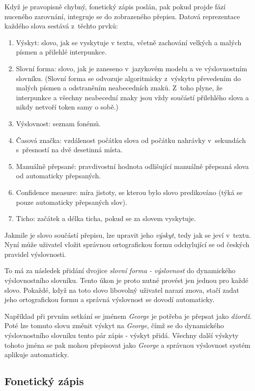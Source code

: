Když je pravopisně chybný, fonetický zápis poslán, pak pokud projde fází
nuceného zarovnání, integruje se do zobrazeného přepisu. Datová reprezentace
každého slova sestává z~těchto prvků:
\begin{enumerate}
\item{Výskyt:
    slovo, jak se vyskytuje v textu, včetně zachování velkých a malých písmen a
    přilehlé interpunkce.
}
\item{Slovní forma:
    slovo, jak je zaneseno v~jazykovém modelu a ve výslovnostním slovníku.
    (Slovní forma se odvozuje algoritmicky z~výskytu převedením do malých písmen
    a odstraněním neabecedních znaků. Z~toho plyne, že interpunkce a všechny
    neabecední znaky jsou vždy součástí přilehlého slova a nikdy netvoří token
    samy o sobě.)
}
\item{Výslovnost:
    seznam fonémů.
}
\item{Časová značka:
    vzdálenost počátku slova od počátku nahrávky v~sekundách s~přesností na dvě
    desetinná místa.
}
\item{Manuálně přepsané:
    pravdivostní hodnota odlišující manuálně přepsaná slova od automaticky
    přepsaných.
}
\item{Confidence measure:
    míra jistoty, se kterou bylo slovo predikováno (týká se pouze automaticky
    přepsaných slov).
}
\item{Ticho:
    začátek a délka ticha, pokud se za slovem vyskytuje.
}
\end{enumerate}
Jakmile je slovo součástí přepisu, lze upravit jeho {\em výskyt}, tedy jak se
jeví v~textu. Nyní může uživatel vložit správnou ortografickou formu odchylující
se od českých pravidel výslovnosti.

To má za následek přidání dvojice {\em slovní forma - výslovnost} do dynamického
výslovnostního slovníku. Tento úkon je proto nutné provést jen jednou pro každé
slovo. Pokaždé, když na toto slovo libovolný uživatel narazí znova, stačí zadat jeho
ortografickou formu a správná výslovnost se dovodí automaticky.

Například při prvním setkání se jménem {\em George} je potřeba je přepsat jako
{\em džordž}. Poté lze tomuto slovu změnit výskyt na {\em George}, čímž se do
dynamického výslovnostního slovníku tento pár zápis - výskyt přidá. Všechny
další výskyty tohoto jména se pak mohou přepisovat jako {\em George} a správnou
výslovnost systém aplikuje automaticky.

\subsection{Fonetický zápis}
\label{ssec:respelling}

